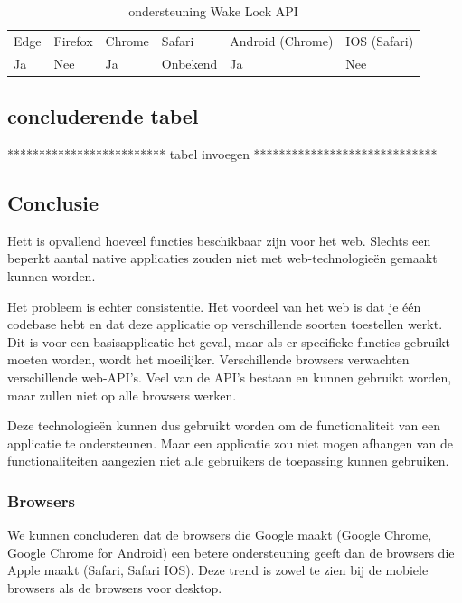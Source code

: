 \begin{table}[H]
	\centering
	\begin{tabular}{llllll}
		Edge & Firefox & Chrome & Safari & Android (Chrome) & IOS (Safari) \\
		Ja   & Nee      &  Ja   & Onbekend     & Ja               & Nee          
	\end{tabular}	
	\caption{ondersteuning  Wake Lock API  }
	\label{ondersteuning  Wake Lock API }
\end{table}

\subsection{concluderende tabel}




************************* tabel invoegen *****************************

\subsection{Conclusie}

Hett is opvallend hoeveel functies beschikbaar zijn voor het web. Slechts een beperkt aantal native applicaties zouden niet met web-technologieën gemaakt kunnen worden.

Het probleem is echter consistentie. Het voordeel van het web is dat je één codebase hebt en dat deze applicatie op verschillende soorten toestellen werkt. Dit is voor een basisapplicatie het geval, maar als er specifieke functies gebruikt moeten worden, wordt het moeilijker. Verschillende browsers verwachten verschillende web-API’s. Veel van de API’s bestaan en kunnen gebruikt worden, maar zullen niet op alle browsers werken.

Deze technologieën kunnen dus gebruikt worden om de functionaliteit van een applicatie te ondersteunen. Maar een applicatie zou niet mogen afhangen van de functionaliteiten aangezien niet alle gebruikers de toepassing kunnen gebruiken.



\subsubsection{Browsers}

We kunnen concluderen dat de browsers die Google maakt (Google Chrome, Google Chrome for Android) een betere ondersteuning geeft dan de browsers die Apple maakt (Safari, Safari IOS). Deze trend is zowel te zien bij de mobiele browsers als de browsers voor desktop.

